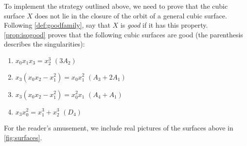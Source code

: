 \documentclass[11pt,reqno, letterpaper]{amsart}
\numberwithin{equation}{section}
\begin{document}
To implement the strategy outlined above, we need to prove that the cubic surface $X$ does not lie in the closure of the orbit of a general cubic surface.
Following \autoref{def:goodfamily}, say that $X$ is \emph{good} if it has this property.
\autoref{prop:isogood} proves that the following cubic surfaces are good (the parenthesis describes the singularities):
\begin{enumerate}
\item $x_0x_1x_3 = x_2^3$ \quad $(3A_2)$
\item $x_3(x_0x_2-x_1^2) = x_0x_1^2$ \quad $(A_3 + 2A_1)$
\item $x_3(x_0x_2-x_1^2) = x_0^2x_1$ \quad $(A_4 + A_1)$
\item $x_3x_0^2 = x_1^3 + x_2^3$ \quad $(D_4)$
\end{enumerate}
For the reader's amusement, we include real pictures of the surfaces above in \autoref{fig:surfaces}.
\end{document}
